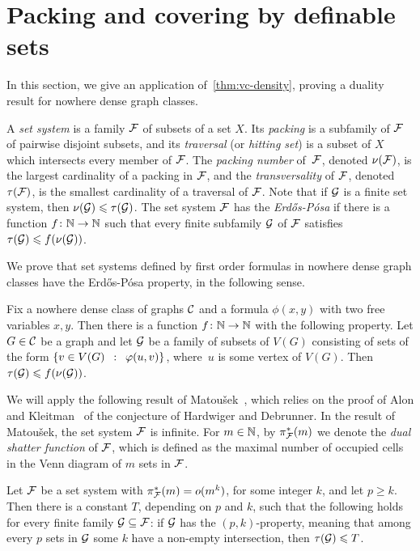 \section{Packing and covering by definable sets}
In this section, we give an application 
of~\cref{thm:vc-density}, proving a 
duality result for nowhere dense graph classes.

A \emph{set system} is a family  $\cal F$ of subsets of a set $X$.
Its  \emph{packing} is a subfamily of $\cal F$ of pairwise disjoint subsets, and its \emph{traversal} (or \emph{hitting set}) is a subset of $X$ which intersects every member of $\cal F$.
The \emph{packing number} of~$\cal F$, denoted $\nu(\cal F)$, is the largest cardinality of a packing in $\cal F$,
and the \emph{transversality} of $\cal F$, denoted
$\tau(\cal F)$, is the smallest cardinality of a traversal of $\cal F$.
Note that if $\cal G$ is a finite set system, then
$\nu({\cal G})\le \tau(\cal G)$. 
The set system $\cal F$ has the \emph{Erd{\H o}s-P{\'o}sa} if there is a function $f\from\N\to\N$ such that every finite subfamily $\cal G$ of $\cal F$
satisfies $\tau({\cal G})\le f(\nu(\cal G))$. 

We prove that set systems defined by first order formulas in nowhere dense graph classes have the Erd{\H o}s-P{\'o}sa property, in the following sense.

\begin{theorem}\label{thm:erdos-posa}
	Fix a nowhere dense class of graphs $\CCC$ and a 
	formula $\phi(x,y)$ with two free variables $x,y$.
	Then there is a function $f\from \N\to\N$ with the following property.
	Let $G\in \CCC$ be a graph and let $\cal G$
	be a family of subsets of $V(G)$ consisting of sets of the form $\setof{v\in V(G)}{\phi(u, v)}$, where~$u$ is some vertex of $V(G)$.
Then~$\tau({\cal G})\le f(\nu(\cal G))$.
\end{theorem}

We will apply the following result of Matou{\v s}ek~\cite{Matousek:2004:BVI:1005787.1005789},
which relies on the proof of Alon and Kleitman~\cite{alon-kleitman} of the conjecture of Hardwiger and Debrunner. 
In the result of Matou{\v s}ek, the set system $\cal F$ is infinite. For $m\in \N$, by $\pi_{\cal F}^*(m)$ we denote the \emph{dual shatter function} of $\cal F$, which is defined as the maximal number 
of occupied cells in the Venn diagram of $m$ sets in $\cal F$.

\begin{theorem}\label{thm:pq}
	Let $\cal F$ be a set system with $\pi^*_{\cal F}(m)=o(m^k)$,
	for some integer $k$, and let $p\ge k$.
	Then there is a constant $T$, depending on $p$ and $k$, such that the following holds for every finite family $\cal G\subset \cal F$: 
	if $\cal G$ has the $(p,k)$-property, meaning that 
	among every $p$ sets in $\cal G$ some $k$ have a non-empty intersection, then $\tau ({\cal G})\le T$.
\end{theorem}

